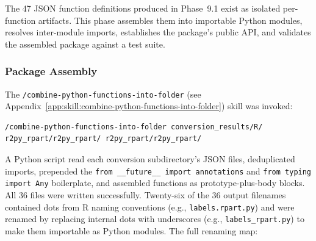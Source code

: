 \documentclass[12pt]{article}
\newcommand{\skillapp}[2]{\texttt{/#1} (see Appendix~\ref{app:skill:#2})}
\begin{document}
The 47 JSON function definitions produced in Phase~9.1 exist as isolated per-function artifacts. This phase assembles them into importable Python modules, resolves inter-module imports, establishes the package's public API, and validates the assembled package against a test suite.

\subsubsection{Package Assembly}

The \skillapp{combine-python-functions-into-folder}{combine-python-functions-into-folder} skill was invoked:
\begin{lstlisting}[style=skill]
/combine-python-functions-into-folder conversion_results/R/ r2py_rpart/r2py_rpart/ r2py_rpart/r2py_rpart/
\end{lstlisting}

A Python script read each conversion subdirectory's JSON files, deduplicated imports, prepended the \texttt{from \_\_future\_\_ import annotations} and \texttt{from typing import Any} boilerplate, and assembled functions as prototype-plus-body blocks. All 36 files were written successfully. Twenty-six of the 36 output filenames contained dots from R naming conventions (e.g., \texttt{labels.rpart.py}) and were renamed by replacing internal dots with underscores (e.g., \texttt{labels\_rpart.py}) to make them importable as Python modules. The full renaming map:
\end{document}
